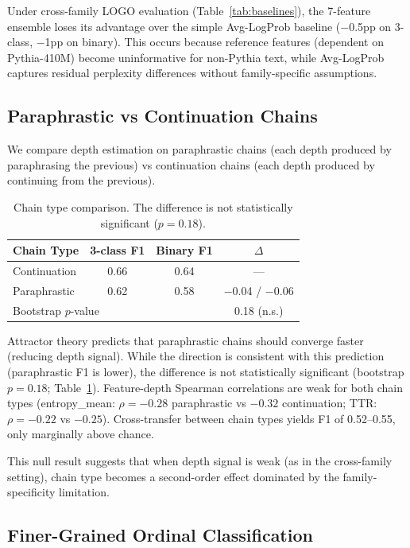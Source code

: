 \documentclass[11pt,a4paper]{article}
\begin{document}
Under cross-family LOGO evaluation (Table~\ref{tab:baselines}), the 7-feature ensemble loses its advantage over the simple Avg-LogProb baseline ($-$0.5pp on 3-class, $-$1pp on binary).
This occurs because reference features (dependent on Pythia-410M) become uninformative for non-Pythia text, while Avg-LogProb captures residual perplexity differences without family-specific assumptions.

\subsection{Paraphrastic vs Continuation Chains}
\label{sec:para}

We compare depth estimation on paraphrastic chains (each depth produced by paraphrasing the previous) vs continuation chains (each depth produced by continuing from the previous).

\begin{table}[h]
\centering
\caption{Chain type comparison. The difference is not statistically significant ($p = 0.18$).}
\label{tab:para}
\begin{tabular}{lccc}
\toprule
Chain Type & 3-class F1 & Binary F1 & $\Delta$ \\
\midrule
Continuation & 0.66 & 0.64 & --- \\
Paraphrastic & 0.62 & 0.58 & $-$0.04 / $-$0.06 \\
\midrule
\multicolumn{3}{l}{Bootstrap $p$-value} & 0.18 (n.s.) \\
\bottomrule
\end{tabular}
\end{table}

Attractor theory predicts that paraphrastic chains should converge faster (reducing depth signal).
While the direction is consistent with this prediction (paraphrastic F1 is lower), the difference is not statistically significant (bootstrap $p = 0.18$; Table~\ref{tab:para}).
Feature-depth Spearman correlations are weak for both chain types (entropy\_mean: $\rho = -0.28$ paraphrastic vs $-0.32$ continuation; TTR: $\rho = -0.22$ vs $-0.25$).
Cross-transfer between chain types yields F1 of 0.52--0.55, only marginally above chance.

This null result suggests that when depth signal is weak (as in the cross-family setting), chain type becomes a second-order effect dominated by the family-specificity limitation.

\subsection{Finer-Grained Ordinal Classification}
\label{sec:ordinal}
\end{document}

